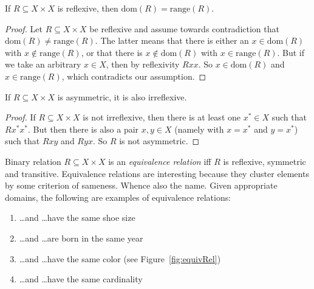 \documentclass[nobib,nofonts]{tufte-handout}
\begin{document}
\begin{proposition}
  \label{prop:proof-reflexive-range}
  If $R \subseteq X \times X$ is reflexive, then $\text{dom}(R) = \text{range}(R)$.
\end{proposition}

\begin{proof}
  Let $R \subseteq X \times X$ be reflexive and assume towards contradiction that $\text{dom}(R) \neq \text{range}(R)$. The latter means that there is either an
  $x \in \text{dom}(R)$ with $x \not \in \text{range}(R)$, or that there is $x \not \in
  \text{dom}(R)$ with $x \in \text{range}(R)$. But if we take an arbitrary $x \in X$, then by
  reflexivity $Rxx$. So $x \in \text{dom}(R)$ and $x \in \text{range}(R)$, which contradicts
  our assumption.
\end{proof}

\begin{proposition}
  If $R \subseteq X \times X$ is asymmetric, it is also irreflexive.
\end{proposition}

\begin{proof}
  If $R \subseteq X \times X$ is not irreflexive, then there is at least one $x^* \in X$ such
  that $Rx^*x^*$. But then there is also a pair $x,y \in X$ (namely with $x=x^*$ and $y = x^*$)
  such that $Rxy$ and $Ryx$. So $R$ is not asymmetric.
\end{proof}

\noindent Binary relation $R \subseteq X \times X$ is an \emph{equivalence relation} iff $R$ is reflexive,
symmetric and transitive. Equivalence relations are interesting because they cluster elements
by some criterion of sameness. Whence also the name. Given appropriate domains, the following
are examples of equivalence relations:
\begin{enumerate}
\item[] \dots and \dots have the same shoe size
\item[] \dots and \dots are born in the same year
\item[] \dots and \dots have the same color (see Figure~\ref{fig:equivRel})
\item[] \dots and \dots have the same cardinality
\end{enumerate}
\end{document}
